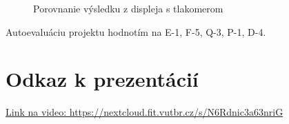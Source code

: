 \documentclass[11pt,a4paper]{article}
\begin{document}
	\begin{figure}[h] 
		\centering
		\caption{Porovnanie výsledku z displeja s tlakomerom}
		\label{comparasion}
	\end{figure}	
	
	Autoevaluáciu projektu hodnotím na E-1, F-5, Q-3, P-1, D-4.
	
	\section{Odkaz k prezentácií}
	\href{https://nextcloud.fit.vutbr.cz/s/N6Rdnic3a63nriG}{Link na video: https://nextcloud.fit.vutbr.cz/s/N6Rdnic3a63nriG}

	\nocite{*}
    	
    	\renewcommand{\refname}{Literatúra}
    	
\end{document}
